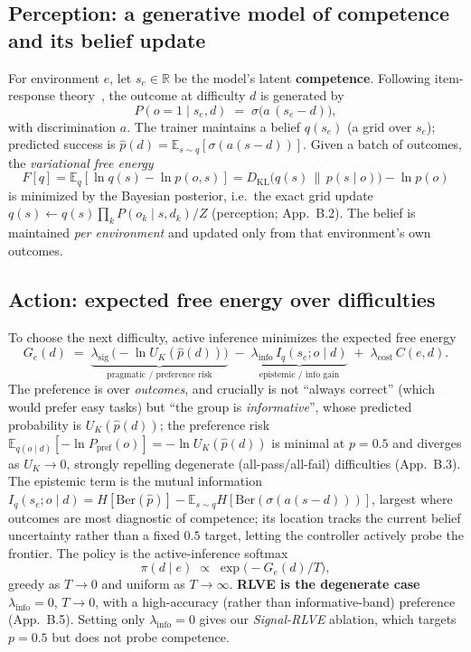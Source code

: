 \documentclass{article}
\newcommand{\UK}{U_{K}}
\newcommand{\Eq}[1]{\mathbb{E}_{q}\!\left[#1\right]}
\newcommand{\KL}{D_{\mathrm{KL}}}
\begin{document}
\subsection{Perception: a generative model of competence and its belief update}
For environment $e$, let $s_e\in\mathbb{R}$ be the model's latent \textbf{competence}.
Following item-response theory~\citep{rasch1960probabilistic}, the outcome at
difficulty $d$ is generated by
\begin{equation}
P(o=1\mid s_e,d) \;=\; \sigma\!\big(a\,(s_e-d)\big),
\end{equation}
with discrimination $a$. The trainer maintains a belief $q(s_e)$ (a grid over
$s_e$); predicted success is $\hat p(d)=\mathbb{E}_{s\sim q}[\sigma(a(s-d))]$.
Given a batch of outcomes, the \emph{variational free energy}
\begin{equation}
F[q]=\Eq{\ln q(s)-\ln p(o,s)}=\KL\!\big(q(s)\,\|\,p(s\mid o)\big)-\ln p(o)
\end{equation}
is minimized by the Bayesian posterior, i.e.\ the exact grid update
$q(s)\leftarrow q(s)\prod_k P(o_k\mid s,d_k)/Z$ (perception; App.~B.2). The belief
is maintained \emph{per environment} and updated only from that environment's
own outcomes.

\subsection{Action: expected free energy over difficulties}
To choose the next difficulty, active inference minimizes the expected free energy
\begin{equation}
G_e(d) \;=\; \underbrace{\lambda_{\mathrm{sig}}\,\big(-\ln \UK(\hat p(d))\big)}_{\text{pragmatic / preference risk}}
\;-\; \underbrace{\lambda_{\mathrm{info}}\,I_q(s_e;o\mid d)}_{\text{epistemic / info gain}}
\;+\; \lambda_{\mathrm{cost}}\,C(e,d).
\label{eq:efe}
\end{equation}
The preference is over \emph{outcomes}, and crucially is not ``always correct''
(which would prefer easy tasks) but ``the group is \emph{informative}'', whose
predicted probability is $\UK(\hat p(d))$; the preference risk
$\mathbb{E}_{q(o\mid d)}[-\ln P_{\mathrm{pref}}(o)]=-\ln \UK(\hat p(d))$ is minimal
at $p{=}0.5$ and diverges as $\UK\!\to\!0$, strongly repelling degenerate
(all-pass/all-fail) difficulties (App.~B.3). The epistemic term is the mutual
information $I_q(s_e;o\mid d)=H[\mathrm{Ber}(\hat p)]-\mathbb{E}_{s\sim q}H[\mathrm{Ber}(\sigma(a(s-d)))]$,
largest where outcomes are most diagnostic of competence; its location tracks the
current belief uncertainty rather than a fixed $0.5$ target, letting the
controller actively probe the frontier. The policy is the active-inference softmax
\begin{equation}
\pi(d\mid e)\;\propto\;\exp\!\big(-G_e(d)/T\big),
\end{equation}
greedy as $T\!\to\!0$ and uniform as $T\!\to\!\infty$. \textbf{RLVE is the
degenerate case} $\lambda_{\mathrm{info}}{=}0$, $T\!\to\!0$, with a high-accuracy
(rather than informative-band) preference (App.~B.5). Setting only
$\lambda_{\mathrm{info}}{=}0$ gives our \emph{Signal-RLVE} ablation, which targets
$p{=}0.5$ but does not probe competence.
\end{document}
